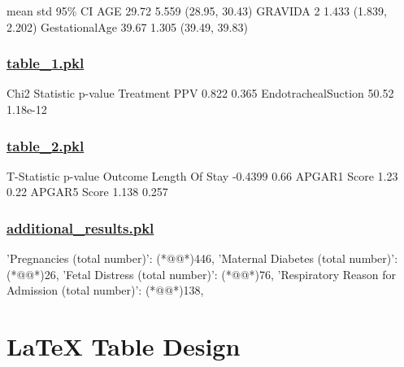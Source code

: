 \documentclass[11pt]{article}
\begin{document}
\begin{codeoutput}
                mean   std          95\% CI
AGE            29.72 5.559  (28.95, 30.43)
GRAVIDA            2 1.433  (1.839, 2.202)
GestationalAge 39.67 1.305  (39.49, 39.83)
\end{codeoutput}\hypertarget{file-table-1-pkl}{}

\subsubsection*{\hyperlink{code-Data Analysis-table-1-pkl}{table\_1.pkl}}

\begin{codeoutput}
                     Chi2 Statistic   p-value
Treatment                                    
PPV                           0.822     0.365
EndotrachealSuction           50.52  1.18e-12
\end{codeoutput}\hypertarget{file-table-2-pkl}{}

\subsubsection*{\hyperlink{code-Data Analysis-table-2-pkl}{table\_2.pkl}}

\begin{codeoutput}
                T-Statistic p-value
Outcome                            
Length Of Stay      -0.4399    0.66
APGAR1 Score           1.23    0.22
APGAR5 Score          1.138   0.257
\end{codeoutput}\hypertarget{file-additional-results-pkl}{}

\subsubsection*{\hyperlink{code-Data Analysis-additional-results-pkl}{additional\_results.pkl}}

\begin{codeoutput}
{
    'Pregnancies (total number)': (*@@*)446,
    'Maternal Diabetes (total number)': (*@@*)26,
    'Fetal Distress (total number)': (*@@*)76,
    'Respiratory Reason for Admission (total number)': (*@@*)138,
}
\end{codeoutput}

\section{LaTeX Table Design}
\end{document}
